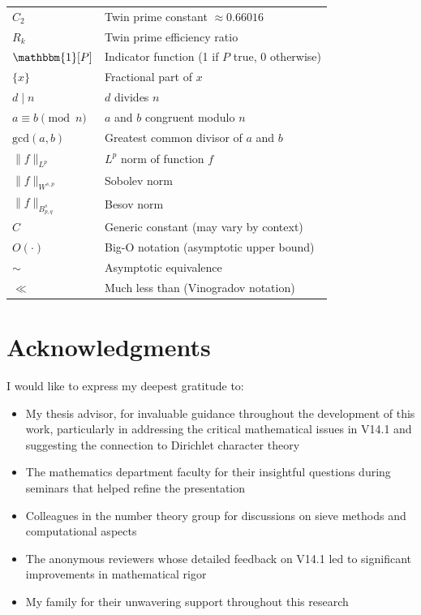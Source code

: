 ﻿\documentclass[12pt,a4paper]{report}
\theoremstyle{plain}
\theoremstyle{definition}
\renewcommand{\gcd}{\text{gcd}}
\begin{document}
\begin{center}
\begin{tabular}{ll}
$C_2$ & Twin prime constant $\approx 0.66016$ \\
$R_k$ & Twin prime efficiency ratio \\
$\mathbbm{1}[P]$ & Indicator function (1 if $P$ true, 0 otherwise) \\
$\{x\}$ & Fractional part of $x$ \\
$d \mid n$ & $d$ divides $n$ \\
$a \equiv b \pmod{n}$ & $a$ and $b$ congruent modulo $n$ \\
$\gcd(a,b)$ & Greatest common divisor of $a$ and $b$ \\
$\|f\|_{L^p}$ & $L^p$ norm of function $f$ \\
$\|f\|_{W^{s,p}}$ & Sobolev norm \\
$\|f\|_{B^s_{p,q}}$ & Besov norm \\
$C$ & Generic constant (may vary by context) \\
$O(\cdot)$ & Big-O notation (asymptotic upper bound) \\
$\sim$ & Asymptotic equivalence \\
$\ll$ & Much less than (Vinogradov notation) \\
\bottomrule
\end{tabular}
\end{center}

\vspace{1cm}

\chapter*{Acknowledgments}

I would like to express my deepest gratitude to:

\begin{itemize}
    \item My thesis advisor, for invaluable guidance throughout the development of this work, particularly in addressing the critical mathematical issues in V14.1 and suggesting the connection to Dirichlet character theory
    
    \item The mathematics department faculty for their insightful questions during seminars that helped refine the presentation
    
    \item Colleagues in the number theory group for discussions on sieve methods and computational aspects
    
    \item The anonymous reviewers whose detailed feedback on V14.1 led to significant improvements in mathematical rigor
    
    \item My family for their unwavering support throughout this research
\end{itemize}
\end{document}
